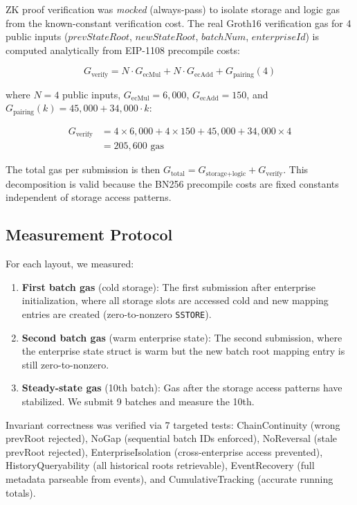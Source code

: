 ZK proof verification was \emph{mocked} (always-pass) to isolate storage and logic gas
from the known-constant verification cost. The real Groth16 verification gas for 4 public
inputs ($\mathit{prevStateRoot}$, $\mathit{newStateRoot}$, $\mathit{batchNum}$,
$\mathit{enterpriseId}$) is computed analytically from EIP-1108 precompile costs:

\begin{equation}
\label{eq:groth16-gas}
G_{\text{verify}} = N \cdot G_{\text{ecMul}} + N \cdot G_{\text{ecAdd}} + G_{\text{pairing}}(4)
\end{equation}

\noindent where $N = 4$ public inputs, $G_{\text{ecMul}} = 6{,}000$, $G_{\text{ecAdd}} = 150$,
and $G_{\text{pairing}}(k) = 45{,}000 + 34{,}000 \cdot k$:

\begin{equation}
\label{eq:groth16-total}
\begin{split}
G_{\text{verify}} &= 4 \!\times\! 6{,}000 + 4 \!\times\! 150 + 45{,}000 + 34{,}000 \!\times\! 4 \\
                  &= 205{,}600 \text{ gas}
\end{split}
\end{equation}

The total gas per submission is then $G_{\text{total}} = G_{\text{storage+logic}} +
G_{\text{verify}}$. This decomposition is valid because the BN256 precompile costs are
fixed constants independent of storage access patterns.

\subsection{Measurement Protocol}

For each layout, we measured:
\begin{enumerate}
\item \textbf{First batch gas} (cold storage): The first submission after enterprise
initialization, where all storage slots are accessed cold and new mapping entries are
created (zero-to-nonzero \texttt{SSTORE}).
\item \textbf{Second batch gas} (warm enterprise state): The second submission, where the
enterprise state struct is warm but the new batch root mapping entry is still
zero-to-nonzero.
\item \textbf{Steady-state gas} (10th batch): Gas after the storage access patterns have
stabilized. We submit 9 batches and measure the 10th.
\end{enumerate}

Invariant correctness was verified via 7 targeted tests: ChainContinuity (wrong prevRoot
rejected), NoGap (sequential batch IDs enforced), NoReversal (stale prevRoot rejected),
EnterpriseIsolation (cross-enterprise access prevented), HistoryQueryability (all historical
roots retrievable), EventRecovery (full metadata parseable from events), and
CumulativeTracking (accurate running totals).
